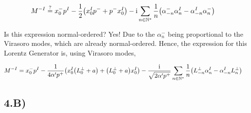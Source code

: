 \begin{align*}
    M^{-I}&\stackrel{?}{=}x_0^- p^I-\frac12\qty(x_0^I p^-+p^-x_0^I)-\textnormal{i}\sum\limits_{n\in\mathbb N^\ast}\frac{1}{n}\qty(\alpha^-_{-n}\alpha^I_{n}-\alpha^I_{-n}\alpha^-_{n})
\end{align*}

Is this expression normal-ordered? Yes! Due to the $\alpha_n^-$ being proportional to the Virasoro modes, which are already normal-ordered. Hence, the expression for this 
Lorentz Generator is, using Virasoro modes,

\begin{align*}
    M^{-I}&=x_0^- p^I-\frac{1}{4\alpha'p^+}\qty(x_0^I\qty(L_0^\perp+a)+\qty(L_0^\perp+a)x_0^I)-\frac{\textnormal{i}}{\sqrt{2\alpha'p^+}}\sum\limits_{n\in\mathbb N^\ast}\frac{1}{n}\qty(L^\perp_{-n}\alpha^I_{n}-\alpha^I_{-n}L^\perp_n)
\end{align*}

\subsection{4.B)}